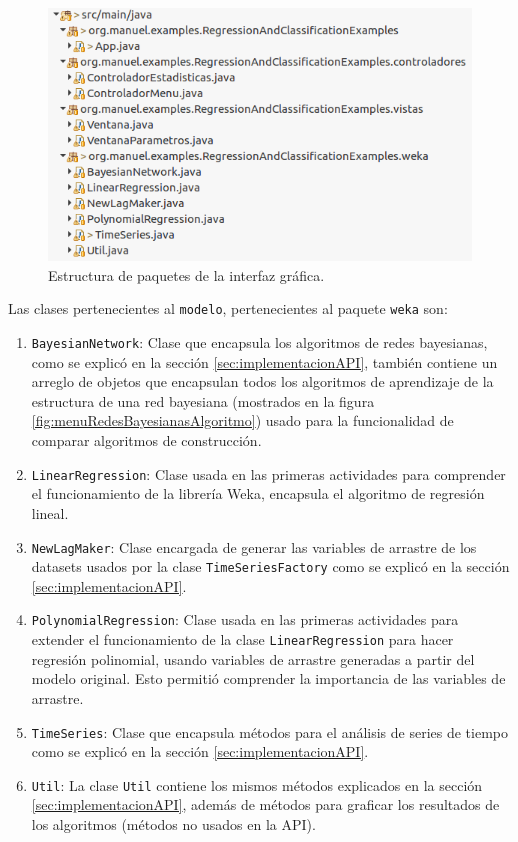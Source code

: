 \begin{figure}[ht]%
	\centering
	\includegraphics[width=15cm]{img/paquetesInterfaz.png}
	\caption{Estructura de paquetes de la interfaz gráfica.}
	\label{fig:estructuraAPI}
\end{figure}

Las clases pertenecientes al \texttt{modelo}, pertenecientes al paquete \texttt{weka} son:

\renewcommand{\labelenumi}{$\bullet$ }
\begin{enumerate}
	\item \texttt{BayesianNetwork}: Clase que encapsula los algoritmos de redes bayesianas, como se explicó en la sección \ref{sec:implementacionAPI}, también contiene un arreglo de objetos que encapsulan todos los algoritmos de aprendizaje de  la estructura de una red bayesiana (mostrados en la figura \ref{fig:menuRedesBayesianasAlgoritmo}) usado para la funcionalidad de comparar algoritmos de construcción.
	
	\item \texttt{LinearRegression}: Clase usada en las primeras actividades para comprender el funcionamiento de la librería Weka, encapsula el algoritmo de regresión lineal.
	
	\item \texttt{NewLagMaker}: Clase encargada de generar las variables de arrastre de los datasets usados por la clase \texttt{TimeSeriesFactory} como se explicó en la sección \ref{sec:implementacionAPI}.
	
	\item \texttt{PolynomialRegression}: Clase usada en las primeras actividades para extender el funcionamiento de la clase \texttt{LinearRegression} para hacer regresión polinomial, usando variables de arrastre generadas a partir del modelo original. Esto permitió comprender la importancia de las variables de arrastre. %
	
	\item \texttt{TimeSeries}: Clase que encapsula métodos para el análisis de series de tiempo como se explicó en la sección \ref{sec:implementacionAPI}.
	
	\item \texttt{Util}: La clase \texttt{Util} contiene los mismos métodos explicados en la sección \ref{sec:implementacionAPI}, además de métodos para graficar los resultados de los algoritmos (métodos no usados en la API).	
\end{enumerate}

